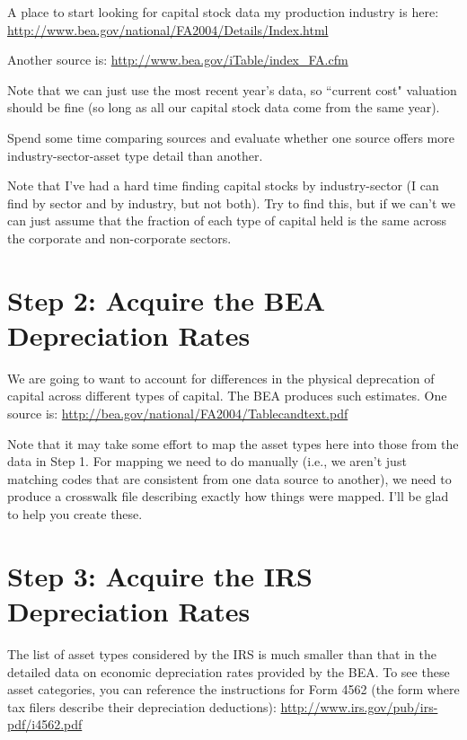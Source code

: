 \documentclass[article,11pt,letterpaper,fleqn]{article}
\theoremstyle{definition}
\numberwithin{equation}{section}
\begin{document}
A place to start looking for capital stock data my production industry is here: \\
\href{http://www.bea.gov/national/FA2004/Details/Index.html}{http://www.bea.gov/national/FA2004/Details/Index.html}

Another source is: \href{http://www.bea.gov/iTable/index\_FA.cfm}{http://www.bea.gov/iTable/index\_FA.cfm}

Note that we can just use the most recent year's data, so ``current cost" valuation should be fine (so long as all our capital stock data come from the same year).

Spend some time comparing sources and evaluate whether one source offers more industry-sector-asset type detail than another.

Note that I've had a hard time finding capital stocks by industry-sector (I can find by sector and by industry, but not both).  Try to find this, but if we can't we can just assume that the fraction of each type of capital held is the same across the corporate and non-corporate sectors.


\section*{Step 2: Acquire the BEA Depreciation Rates}
\label{sec:step1}

We are going to want to account for differences in the physical deprecation of capital across different types of capital.  The BEA produces such estimates.  One source is: \href{http://bea.gov/national/FA2004/Tablecandtext.pdf}{http://bea.gov/national/FA2004/Tablecandtext.pdf}

Note that it may take some effort to map the asset types here into those from the data in Step 1.  For mapping we need to do manually (i.e., we aren't just matching codes that are consistent from one data source to another), we need to produce a crosswalk file describing exactly how things were mapped.  I'll be glad to help you create these.

\section*{Step 3: Acquire the IRS Depreciation Rates}
\label{sec:step3}

The list of asset types considered by the IRS is much smaller than that in the detailed data on economic depreciation rates provided by the BEA.  To see these asset categories, you can reference the instructions for Form 4562 (the form where tax filers describe their depreciation deductions): \href{http://www.irs.gov/pub/irs-pdf/i4562.pdf}{http://www.irs.gov/pub/irs-pdf/i4562.pdf}
\end{document}
